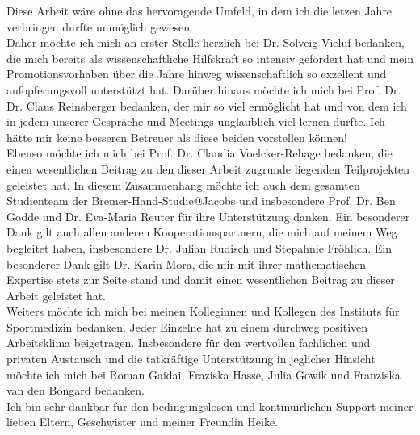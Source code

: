 Diese Arbeit wäre ohne das hervoragende Umfeld, in dem ich die letzen Jahre verbringen durfte unmöglich gewesen.\\
Daher möchte ich mich an erster Stelle herzlich bei Dr. Solveig Vieluf bedanken, die mich bereits als wissenschaftliche Hilfskraft so intensiv gefördert hat und mein Promotionsvorhaben über die Jahre hinweg wissenschaftlich so exzellent und aufopferungsvoll unterstützt hat. Darüber hinaus möchte ich mich bei Prof. Dr. Dr. Claus Reinsberger bedanken, der mir so viel ermöglicht hat und von dem ich in jedem unserer Gespräche und Meetings unglaublich viel lernen durfte. Ich hätte mir keine besseren Betreuer als diese beiden vorstellen können!\\
Ebenso möchte ich mich bei Prof. Dr. Claudia Voelcker-Rehage bedanken, die einen wesentlichen Beitrag zu den dieser Arbeit zugrunde liegenden Teilprojekten geleistet hat. In diesem Zusammenhang möchte ich auch dem gesamten Studienteam der Bremer-Hand-Studie@Jacobs und insbesondere Prof. Dr. Ben Godde und Dr. Eva-Maria Reuter für ihre Unterstützung danken. Ein besonderer Dank gilt auch allen anderen Kooperationspartnern, die mich auf meinem Weg begleitet haben, insbesondere Dr. Julian Rudisch und Stepahnie Fröhlich. Ein besonderer Dank gilt Dr. Karin Mora, die mir mit ihrer mathematischen Expertise stets zur Seite stand und damit einen wesentlichen Beitrag zu dieser Arbeit geleistet hat.\\
Weiters möchte ich mich bei meinen Kolleginnen und Kollegen des Instituts für Sportmedizin bedanken. Jeder Einzelne hat zu einem durchweg positiven Arbeitsklima beigetragen. Insbesondere für den wertvollen fachlichen und privaten Austausch und die tatkräftige Unterstützung in jeglicher Hinsicht möchte ich mich bei Roman Gaidai, Fraziska Hasse, Julia Gowik und Franziska van den Bongard bedanken.\\
Ich bin sehr dankbar für den bedingungslosen und kontinuirlichen Support meiner lieben Eltern, Geschwister und meiner Freundin Heike.